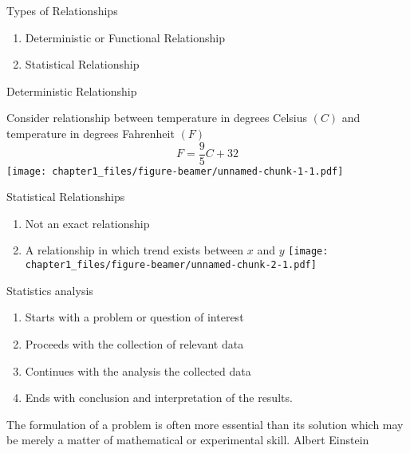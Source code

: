 \begin{frame}

\end{frame}

\begin{frame}{Types of Relationships}
\protect\hypertarget{types-of-relationships}{}

\begin{enumerate}
\tightlist
\item
  Deterministic or Functional Relationship
\item
  Statistical Relationship
\end{enumerate}

\end{frame}

\begin{frame}{Deterministic Relationship}
\protect\hypertarget{deterministic-relationship}{}

Consider relationship between temperature in degrees Celsius \((C)\) and
temperature in degrees Fahrenheit \((F)\) \[F=\frac{9}{5}C+32\]
\texttt{[image: chapter1\_files/figure-beamer/unnamed-chunk-1-1.pdf]}

\end{frame}

\begin{frame}{Statistical Relationships}
\protect\hypertarget{statistical-relationships}{}

\begin{enumerate}
\tightlist
\item
  Not an exact relationship
\item
  A relationship in which {trend} exists between \(x\) and \(y\)
  \texttt{[image: chapter1\_files/figure-beamer/unnamed-chunk-2-1.pdf]}
\end{enumerate}

\end{frame}

\begin{frame}{Statistics analysis}
\protect\hypertarget{statistics-analysis}{}

\begin{enumerate}
\tightlist
\item
  Starts with a problem or question of interest
\item
  Proceeds with the collection of relevant data
\item
  Continues with the analysis the collected data
\item
  Ends with conclusion and interpretation of the results.
\end{enumerate}

The formulation of a problem is often more essential than its solution
which may be merely a matter of mathematical or experimental skill.
Albert Einstein

\end{frame}

